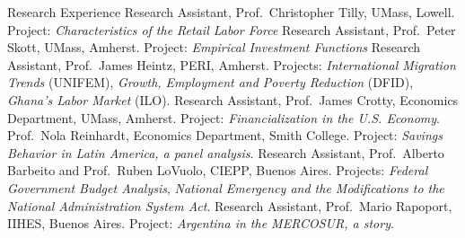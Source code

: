 
\def\arraystretch{1.3}

\begin{rubric}{Research Experience}
\entry*[2008] Research Assistant, Prof.~Christopher Tilly, UMass, Lowell.\newline
            Project: \emph{Characteristics of the Retail Labor Force}
\entry*[2008] Research Assistant, Prof.~Peter Skott, UMass, Amherst. \newline
            Project: \emph{Empirical Investment Functions}
\entry*[2006] Research Assistant, Prof.~James Heintz, PERI, Amherst. \newline
            Projects: \emph{International Migration Trends} (UNIFEM), \emph{Growth, Employment and Poverty Reduction} (DFID), \emph{Ghana's Labor Market} (ILO).
\entry*[2005] Research Assistant, Prof.~James Crotty, Economics Department, UMass, Amherst. \newline
            Project: \emph{Financialization in the U.S. Economy}.
\entry*[2005] Prof.~Nola Reinhardt, Economics Department, Smith College. \newline
            Project: \emph{Savings Behavior in Latin America, a panel analysis}.
\entry*[2001--2] Research Assistant, Prof.~Alberto Barbeito and Prof.~Ruben LoVuolo, CIEPP, Buenos Aires. \newline
            Projects: \emph{Federal Government Budget Analysis}, \emph{National Emergency and the Modifications to the National Administration System Act}.
\entry*[1999--2000] Research Assistant, Prof.~Mario Rapoport, IIHES, Buenos Aires. \newline
            Project: \emph{Argentina in the MERCOSUR, a story}.
\end{rubric} 